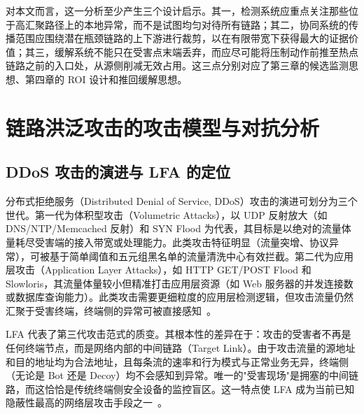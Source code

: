 对本文而言，这一分析至少产生三个设计启示。其一，检测系统应重点关注那些位于高汇聚路径上的本地异常，而不是试图均匀对待所有链路；其二，协同系统的传播范围应围绕潜在瓶颈链路的上下游进行裁剪，以在有限带宽下获得最大的证据价值；其三，缓解系统不能只在受害点末端丢弃，而应尽可能将压制动作前推至热点链路之前的入口处，从源侧削减无效占用。这三点分别对应了第三章的候选监测思想、第四章的 ROI 设计和推回缓解思想。


\section{链路洪泛攻击的攻击模型与对抗分析}

\subsection{DDoS 攻击的演进与 LFA 的定位}

分布式拒绝服务（Distributed Denial of Service, DDoS）攻击的演进可划分为三个世代。第一代为体积型攻击（Volumetric Attacks），以 UDP 反射放大（如 DNS/NTP/Memcached 反射）和 SYN Flood 为代表，其目标是以绝对的流量体量耗尽受害端的接入带宽或处理能力。此类攻击特征明显（流量突增、协议异常），可被基于简单阈值和五元组黑名单的流量清洗中心有效拦截。第二代为应用层攻击（Application Layer Attacks），如 HTTP GET/POST Flood 和 Slowloris，其流量体量较小但精准打击应用层资源（如 Web 服务器的并发连接数或数据库查询能力）。此类攻击需要更细粒度的应用层检测逻辑，但攻击流量仍然汇聚于受害终端，终端侧的异常可被直接感知~\cite{leosecurity}。

LFA 代表了第三代攻击范式的质变。其根本性的差异在于：攻击的受害者不再是任何终端节点，而是网络内部的中间链路（Target Link）。由于攻击流量的源地址和目的地址均为合法地址，且每条流的速率和行为模式与正常业务无异，终端侧（无论是 Bot 还是 Decoy）均不会感知到异常。唯一的"受害现场"是拥塞的中间链路，而这恰恰是传统终端侧安全设备的监控盲区。这一特点使 LFA 成为当前已知隐蔽性最高的网络层攻击手段之一~\cite{crossfire, coremelt}。

